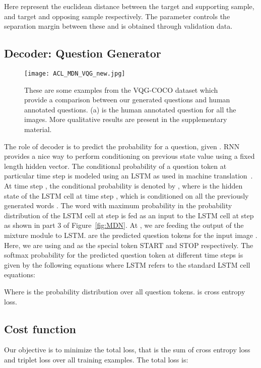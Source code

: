 \documentclass[11pt,a4paper]{article}
\begin{document}
\noindent Here  represent the euclidean distance between the target and supporting sample, and target and opposing sample respectively. The parameter  controls the separation margin between these and is obtained through validation data.


\subsection{Decoder: Question Generator}
\begin{figure*}[ht]
\centering
	\texttt{[image: ACL\_MDN\_VQG\_new.jpg]}
	\vspace{-0.2cm}
	\caption{These are some examples from the VQG-COCO dataset which provide a comparison between our generated questions and human annotated questions. (a) is the human annotated question for all the images. More qualitative results are present in the supplementary material.}
	\label{fig:natural2}
\end{figure*}
\noindent The role of decoder is to predict the probability for a question, given . RNN provides a nice way to perform conditioning on  previous state value using a fixed length hidden vector. 
The conditional probability of a question token at particular time step  is modeled using an LSTM as used in machine translation~\cite{Sutskever_NIPS2014}. 
At time step , the conditional probability is denoted by , where  is the hidden state of the LSTM cell at time step , which is conditioned on all the previously generated words .
The word with maximum probability in the probability distribution of the LSTM cell at step   is fed as an input to the LSTM cell at step  as shown in part 3 of Figure~\ref{fig:MDN}. At , we are feeding the output of the mixture module to LSTM.  are the predicted question tokens for the input image . Here, we are using  and  as the special token START and STOP respectively. 
The softmax probability for the predicted question token at different time steps is given by the following equations where LSTM refers to the standard LSTM cell equations:

 Where   is the probability distribution over all question tokens.  is cross entropy loss.




\subsection{Cost function}
\noindent Our objective is to minimize the total loss, that is the sum of cross entropy loss and triplet loss over all training examples.
  The total loss is: 
  
\end{document}
